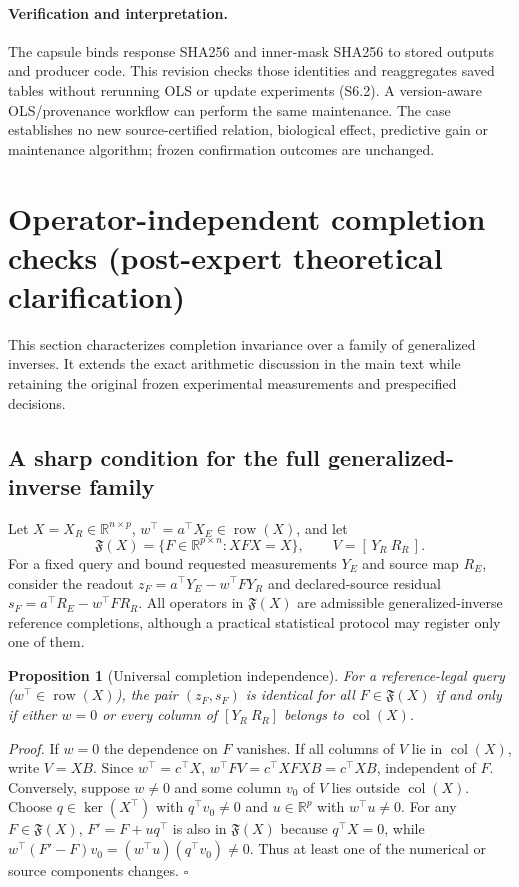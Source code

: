 \documentclass[11pt]{article}
\newtheorem{proposition}{Proposition}
\begin{document}
\paragraph{Verification and interpretation.}
The capsule binds response SHA256 \texttt{} and inner-mask SHA256 \texttt{} to stored outputs and producer code. This revision checks those identities and reaggregates saved tables without rerunning OLS or update experiments (S6.2). A version-aware OLS/provenance workflow can perform the same maintenance. The case establishes no new source-certified relation, biological effect, predictive gain or maintenance algorithm; frozen confirmation outcomes are unchanged.



\clearpage
\section{Operator-independent completion checks (post-expert theoretical clarification)}
\label{sec:operator-robustness}
This section characterizes completion invariance over a family of generalized inverses. It extends the exact arithmetic discussion in the main text while retaining the original frozen experimental measurements and prespecified decisions.

\subsection{A sharp condition for the full generalized-inverse family}
Let $X=X_R\in\mathbb R^{n\times p}$, $w^\top=a^\top X_E\in\operatorname{row}(X)$, and let
\[
\mathfrak F(X)=\{F\in\mathbb R^{p\times n}: XFX=X\},\qquad V=[\,Y_R\ R_R\,].
\]
For a fixed query and bound requested measurements $Y_E$ and source map $R_E$, consider the readout $z_F=a^\top Y_E-w^\top FY_R$ and declared-source residual $s_F=a^\top R_E-w^\top FR_R$. All operators in $\mathfrak F(X)$ are admissible generalized-inverse reference completions, although a practical statistical protocol may register only one of them.
\begin{proposition}[Universal completion independence]
\label{prop:universalcompletion}
For a reference-legal query ($w^\top\in\operatorname{row}(X)$), the pair $(z_F,s_F)$ is identical for all $F\in\mathfrak F(X)$ if and only if either $w=0$ or every column of $[Y_R\ R_R]$ belongs to $\operatorname{col}(X)$.
\end{proposition}
\noindent\emph{Proof.} If $w=0$ the dependence on $F$ vanishes. If all columns of $V$ lie in $\operatorname{col}(X)$, write $V=XB$. Since $w^\top=c^\top X$, $w^\top FV=c^\top XFXB=c^\top XB$, independent of $F$. Conversely, suppose $w\ne0$ and some column $v_0$ of $V$ lies outside $\operatorname{col}(X)$. Choose $q\in\ker(X^\top)$ with $q^\top v_0\ne0$ and $u\in\mathbb R^p$ with $w^\top u\ne0$. For any $F\in\mathfrak F(X)$, $F'=F+u q^\top$ is also in $\mathfrak F(X)$ because $q^\top X=0$, while $w^\top(F'-F)v_0=(w^\top u)(q^\top v_0)\ne0$. Thus at least one of the numerical or source components changes. $\square$
\end{document}
